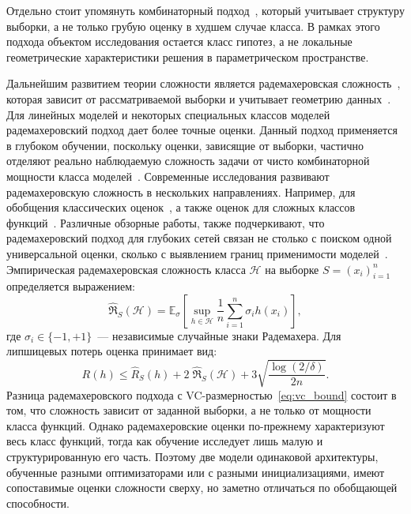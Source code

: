 \documentclass[russian]{intsys}
\begin{document}
Отдельно стоит упомянуть комбинаторный подход~\cite{vorontsov2004combinatorial}, который учитывает структуру выборки, а не только грубую оценку в худшем случае класса.
В рамках этого подхода объектом исследования остается класс гипотез, а не локальные геометрические характеристики решения в параметрическом пространстве.

Дальнейшим развитием теории сложности является радемахеровская сложность~\cite{koltchinskii2001rademacher,bartlett2002rademacher}, которая зависит от рассматриваемой выборки и учитывает геометрию данных~\cite{truong2022rademacher,algorithmicRademacher2023}.
Для линейных моделей и некоторых специальных классов моделей радемахеровский подход дает более точные оценки.
Данный подход применяется в глубоком обучении, поскольку оценки, зависящие от выборки, частично отделяют реально наблюдаемую сложность задачи от чисто комбинаторной мощности класса моделей~\cite{truong2022rademacher,algorithmicRademacher2023}.
Современные исследования развивают радемахеровскую сложность в нескольких направлениях. Например, для обобщения классических оценок~\cite{bartlett1996vcreal}, а также оценок для сложных классов функций~\cite{vapnik1999vccontrol}.
Различные обзорные работы, также подчеркивают, что радемахеровский подход для глубоких сетей связан не столько с поиском одной универсальной оценки, сколько с выявлением границ применимости моделей~\cite{golowich2016lessons,valleperez2020bounds}.
Эмпирическая радемахеровская сложность класса $\mathcal H$ на выборке $S=(x_i)_{i=1}^n$ определяется выражением:
\begin{equation}
\hat{\mathfrak R}_S(\mathcal H)=
\mathbb E_{\sigma}\!\left[\sup_{h\in\mathcal H}\frac{1}{n}\sum_{i=1}^n \sigma_i h(x_i)\right],
\label{eq:rademacher_def}
\end{equation}
где $\sigma_i\in\{-1,+1\}$~--- независимые случайные знаки Радемахера. Для липшицевых потерь оценка принимает вид:
\begin{equation}
R(h)\le \hat R_S(h)+2\;\hat{\mathfrak R}_S(\mathcal H)+3\sqrt{\frac{\log(2/\delta)}{2n}}.
\label{eq:rademacher_bound}
\end{equation}
Разница радемахеровского подхода с VC-размерностью~\eqref{eq:vc_bound} состоит в том, что сложность зависит от заданной выборки, а не только от мощности класса функций.
Однако радемахеровские оценки по-прежнему характеризуют весь класс функций, тогда как обучение исследует лишь малую и структурированную его часть.
Поэтому две модели одинаковой архитектуры, обученные разными оптимизаторами или с разными инициализациями, имеют сопоставимые оценки сложности сверху, но заметно отличаться по обобщающей способности.
\end{document}
